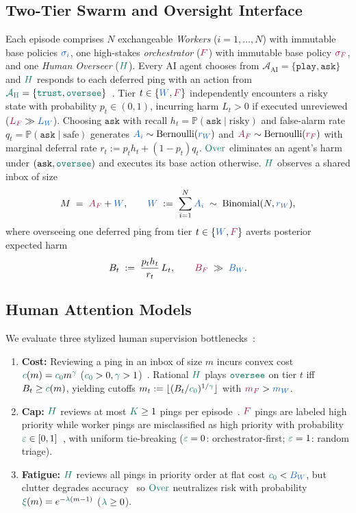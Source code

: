\documentclass[11pt,reqno]{amsart}
\theoremstyle{spacious}
\newcommand{\Wtxt}[1]{\textcolor{colW}{#1}}
\newcommand{\Ftxt}[1]{\textcolor{colF}{#1}}
\newcommand{\Htxt}[1]{\textcolor{colH}{#1}}
\newcommand{\Wv}[1]{{\color{colW}#1}}
\newcommand{\Fv}[1]{{\color{colF}#1}}
\newcommand{\Hv}[1]{{\color{colH}#1}}
\newcommand{\Prob}{\mathbb{P}}
\newcommand{\ask}{\mathtt{ask}}
\newcommand{\play}{\mathtt{play}}
\newcommand{\oversee}{{\color{colH}\mathtt{oversee}}}
\newcommand{\trust}{{\color{colH}\mathtt{trust}}}
\newcommand{\Over}{{\color{colH}\mathrm{Over}}}
\begin{document}
\subsection*{Two-Tier Swarm and Oversight Interface}
Each episode comprises $N$ exchangeable \emph{\Wtxt{Workers}} ($i = 1,\dots,N$) with immutable base policies $\Wv{\sigma_i}$, one high-stakes \emph{\Ftxt{orchestrator}} ($\Fv{F}$) with immutable base policy $\Fv{\sigma_F}$, and one \emph{\Htxt{Human Overseer}} ($\Hv{H}$). Every AI agent chooses from $\mathcal{A}_{\mathrm{AI}} = \{\play,\ask\}$ and $\Hv{H}$ responds to each deferred ping with an action from $\Hv{\mathcal{A}_{\mathrm{H}}} = \{\trust,\oversee\}$~\cite{overman2026oversight}. Tier $t \in \{\Wv{W}, \Fv{F}\}$ independently encounters a risky state with probability $p_t \in (0,1)$, incurring harm $L_t > 0$ if executed unreviewed ($\Fv{L_F} \gg \Wv{L_W}$). Choosing $\ask$ with recall $h_t = \Prob(\ask\mid\text{risky})$ and false-alarm rate $q_t = \Prob(\ask\mid\text{safe})$ generates $\Wv{A_i} \sim \mathrm{Bernoulli}(\Wv{r_W})$ and $\Fv{A_F} \sim \mathrm{Bernoulli}(\Fv{r_F})$ with marginal deferral rate $r_t := p_t h_t + (1 - p_t) q_t$. $\Over$ eliminates an agent's harm under $(\ask,\oversee)$ and executes its base action otherwise. $\Hv{H}$ observes a shared inbox of size
\[
  M \;=\; \Fv{A_F} + \Wv{W}, \qquad \Wv{W} \;:=\; \sum_{i=1}^N \Wv{A_i} \;\sim\; \mathrm{Binomial}(N, \Wv{r_W}),
\]
where overseeing one deferred ping from tier $t \in \{\Wv{W}, \Fv{F}\}$ averts posterior expected harm
\[
  B_t \;:=\; \frac{p_t h_t}{r_t}\,L_t, \qquad \Fv{B_F} \;\gg\; \Wv{B_W}.
\]

\subsection*{\Htxt{Human} Attention Models}
We evaluate three stylized \Htxt{human} supervision bottlenecks~\cite{lykouris2024congested,lindner2025control,turan2026capacity}:
\begin{enumerate}
  \setlength{\itemsep}{2pt}
  \item \textbf{Cost:} Reviewing a ping in an inbox of size $m$ incurs convex cost $\Hv{c}(m) = \Hv{c_0} m^{\Hv{\gamma}}$ ($\Hv{c_0} > 0, \Hv{\gamma} > 1$)~\cite{lykouris2024congested,saketos2026defer}. Rational $\Hv{H}$ plays $\oversee$ on tier $t$ iff $B_t \ge \Hv{c}(m)$, yielding cutoffs $m_t := \lfloor (B_t / \Hv{c_0})^{1/\Hv{\gamma}} \rfloor$ with $\Fv{m_F} > \Wv{m_W}$.
  \item \textbf{Cap:} $\Hv{H}$ reviews at most $\Hv{K} \ge 1$ pings per episode~\cite{greenblatt2024control,lindner2025control,alves2024deccaf}. $\Fv{F}$ pings are labeled high priority while \Wtxt{worker} pings are misclassified as high priority with probability $\Hv{\varepsilon} \in [0,1]$~\cite{argon2009priority}, with uniform tie-breaking ($\Hv{\varepsilon}=0$: \Ftxt{orchestrator}-first; $\Hv{\varepsilon}=1$: random triage).
  \item \textbf{Fatigue:} $\Hv{H}$ reviews all pings in priority order at flat cost $\Hv{c_0} < \Wv{B_W}$, but clutter degrades accuracy~\cite{turan2026capacity,zhang2026falcon} so $\Over$ neutralizes risk with probability $\Hv{\xi}(m) = e^{-\Hv{\lambda}(m-1)}$ ($\Hv{\lambda} \ge 0$).
\end{enumerate}
\end{document}
